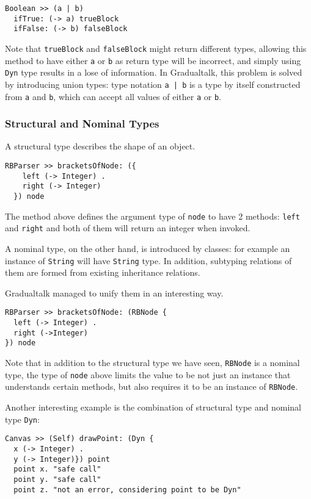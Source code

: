 \begin{verbatim}
Boolean >> (a | b)
  ifTrue: (-> a) trueBlock
  ifFalse: (-> b) falseBlock
\end{verbatim}

Note that \texttt{trueBlock} and \texttt{falseBlock} might return
different types, allowing this method to have either \texttt{a} or \texttt{b}
as return type will be incorrect, and simply using \texttt{Dyn} type
results in a lose of information.
In Gradualtalk, this problem is solved
by introducing union types:
type notation \texttt{a | b} is a type by itself constructed from
\texttt{a} and \texttt{b},
which can accept all values of either \texttt{a} or \texttt{b}.

\subsubsection{Structural and Nominal Types}

A structural type describes the shape of an object.

\begin{verbatim}
RBParser >> bracketsOfNode: ({
    left (-> Integer) .
    right (-> Integer)
  }) node
\end{verbatim}

The method above defines the argument type of \texttt{node} to have 2 methods:
\texttt{left} and \texttt{right} and both of them will return an integer when invoked.

A nominal type, on the other hand, is introduced by classes:
for example an instance of \texttt{String} will have \texttt{String} type.
In addition, subtyping relations of them are formed from existing inheritance relations.

Gradualtalk managed to unify them in an interesting way.

\begin{verbatim}
RBParser >> bracketsOfNode: (RBNode {
  left (-> Integer) .
  right (->Integer)
}) node
\end{verbatim}

Note that in addition to the structural type we have seen,
\texttt{RBNode} is a nominal type, the type of \texttt{node} above
limits the value to be not just an instance that understands certain methods,
but also requires it to be an instance of \texttt{RBNode}.

Another interesting example is the combination of structural type
and nominal type \texttt{Dyn}:

\begin{verbatim}
Canvas >> (Self) drawPoint: (Dyn {
  x (-> Integer) .
  y (-> Integer)}) point
  point x. "safe call"
  point y. "safe call"
  point z. "not an error, considering point to be Dyn"
\end{verbatim}

